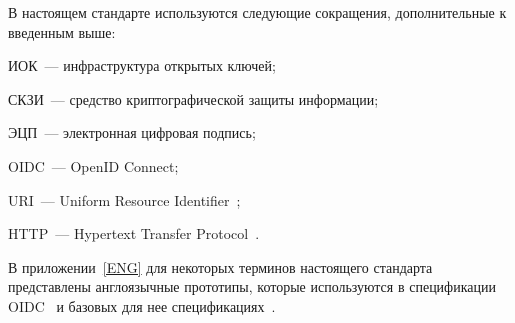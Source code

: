 В настоящем стандарте используются следующие сокращения, дополнительные к 
введенным выше:

ИОК~--- инфраструктура открытых ключей;

СКЗИ~--- средство криптографической защиты информации;

ЭЦП~--- электронная цифровая подпись;

OIDC~--- OpenID Connect;

URI~--- Uniform Resource Identifier~\cite{RFC3986};

HTTP~--- Hypertext Transfer Protocol~\cite{RFC3986}.

В приложении~\ref{ENG} для некоторых терминов настоящего стандарта 
представлены англоязычные прототипы, которые используются в 
спецификации OIDC~\cite{OIDC} и базовых для нее 
спецификациях~\cite{RFC6749,RFC6750}.

